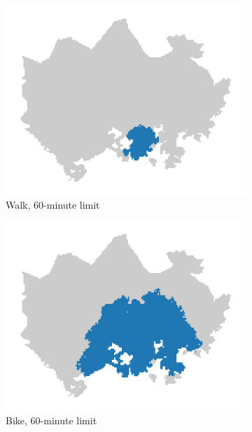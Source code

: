 \begin{figure}[H]
	\centering
	\begin{subfigure}[b]{0.5\textwidth}
		\includegraphics[width=\textwidth]{visual/figures/ttm/tt_limit_walk}
		\caption{Walk, 60-minute limit}
		\label{fig:limit walk}
	\end{subfigure}%
	\hfill
	\begin{subfigure}[b]{0.5\textwidth}
		\includegraphics[width=\textwidth]{visual/figures/ttm/tt_limit_bike}
		\caption{Bike, 60-minute limit}
		\label{fig:limit bike}
	\end{subfigure}%
	\hfill
	\begin{subfigure}[b]{0.5\textwidth}

\end{subfigure}
\end{figure}
